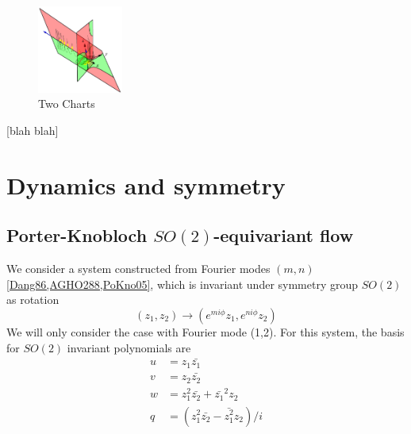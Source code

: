 \documentclass{article}
\begin{document}
\begin{figure}
\centering
\includegraphics[width=0.25\textwidth]{RoessSctAtlas3.png}
\caption{Two Charts}
\label{fig:RoessSctAtlas3}
\end{figure}

 [blah blah]

\section{Dynamics and symmetry}
\label{s:symm}

\subsection{Porter-Knobloch $SO(2)$-equivariant flow}
\label{s:twoMode}

We consider a system constructed from Fourier modes $(m,n)$\ref{Dang86,AGHO288,PoKno05}, which is invariant under symmetry group $SO(2)$ as rotation
\begin{equation}
(z_1,z_2)\to(e^{mi\phi}z_1,e^{ni\phi}z_2)\label{Dang86(1.1)aa}
\end{equation}
We will only consider the case with Fourier mode (1,2). For this system, the basis for $SO(2)$ invariant polynomials are
\begin{align}
u&=z_1\bar{z_1}\\
v&=z_2\bar{z_2}\\
w&=z_1^2\bar{z_2}+\bar{z_1}^2z_2\\
q&=(z_1^2\bar{z_2}-\bar{z_1^2}z_2)/i\\
\label{Dang86(1.2)PK}
\end{align}
\end{document}
